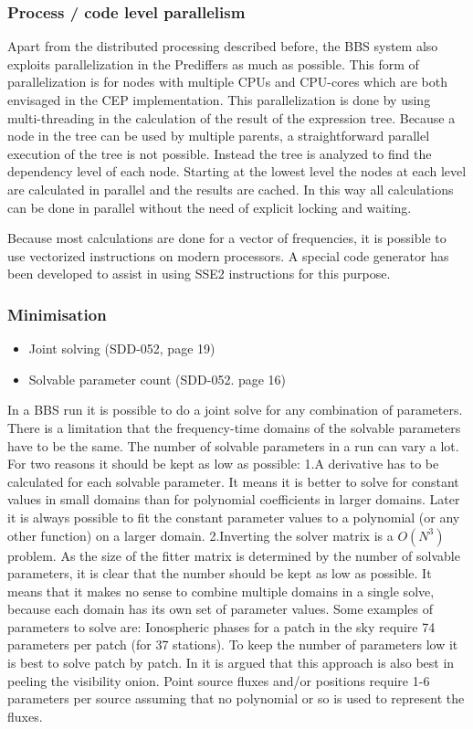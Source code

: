 \documentclass[10pt]{lofar}
\begin{document}
\subsubsection{Process / code level parallelism}
Apart from the distributed processing described before, the BBS system also exploits parallelization in the Prediffers as much as possible. This form of parallelization is for nodes with multiple CPUs and CPU-cores which are both envisaged in the CEP implementation. This parallelization is done by using multi-threading in the calculation of the result of the expression tree. Because a node in the tree can be used by multiple parents, a straightforward parallel execution of the tree is not possible. Instead the tree is analyzed to find the dependency level of each node. Starting at the lowest level the nodes at each level are calculated in parallel and the results are cached. In this way all calculations can be done in parallel without the need of explicit locking and waiting.

Because most calculations are done for a vector of frequencies, it is possible to use vectorized instructions on modern processors. A special code generator has been developed to assist in using SSE2 instructions for this purpose.

\subsubsection{Minimisation}
\begin{itemize}
\item Joint solving (SDD-052, page 19)
\item Solvable parameter count (SDD-052. page 16)
\end{itemize}

In a BBS run it is possible to do a joint solve for any combination of parameters. There is a limitation that the frequency-time domains of the solvable parameters have to be the same.
The number of solvable parameters in a run can vary a lot. For two reasons it should be kept as low as possible:
1.A derivative has to be calculated for each solvable parameter. It means it is better to solve for constant values in small domains than for polynomial coefficients in larger domains. Later it is always possible to fit the constant parameter values to a polynomial (or any other function) on a larger domain.
2.Inverting the solver matrix is a $O(N^3)$ problem. As the size of the fitter matrix is determined by the number of solvable parameters, it is clear that the number should be kept as low as possible.
It means that it makes no sense to combine multiple domains in a single solve, because each domain has its own set of parameter values.
Some examples of parameters to solve are:
Ionospheric phases for a patch in the sky require 74 parameters per patch (for 37 stations).
To keep the number of parameters low it is best to solve patch by patch. In  it is argued that this approach is also best in peeling the visibility onion.
Point source fluxes and/or positions require 1-6 parameters per source assuming that no polynomial or so is used to represent the fluxes.
\end{document}
